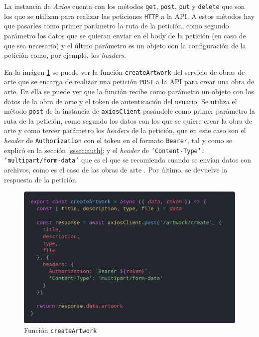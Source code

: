 La instancia de \textit{Axios} \cite{axios} cuenta con los métodos \texttt{get},
\texttt{post}, \texttt{put} y \texttt{delete} que son los que se utilizan para realizar
las peticiones \texttt{HTTP} a la API. A estos métodos hay que pasarles como primer
parámetro la ruta de la petición, como segundo parámetro los datos que se quieran enviar
en el body de la petición (en caso de que sea necesario) y el últmo parámetro es un objeto
con la configuración de la petición como, por ejemplo, los \textit{headers}.

En la imágen \ref{fig:create-artwork-service} se puede ver la función \texttt{createArtwork}
del servicio de obras de arte que se encarga de realizar una petición \texttt{POST} a la API
para crear una obra de arte. En ella se puede ver que la función recibe como parámetro un
objeto con los datos de la obra de arte y el token de autenticación del usuario. Se utiliza
el método \texttt{post} de la instancia de \texttt{axiosClient} pasándole como primer
parámetro la ruta de la petición, como segundo los datos con los que se quiere crear la obra
de arte y como tercer parámetro los \textit{headers} de la petición, que en este caso son
el \textit{header} de \texttt{Authorization} con el token en el formato \texttt{Bearer}, tal
y como se explicó en la sección \ref{sssec:auth}; y el \textit{header} de
\texttt{'Content-Type': 'multipart/form-data'} que es el que se recomienda cuando se envían
datos con archivos, como es el caso de las obras de arte \cite{multipart-form-data}. Por
último, se devuelve la respuesta de la petición.

\begin{figure}[H]
  \centering
  \includegraphics[width=1\textwidth]{img/create-artwork-service}
  \caption{Función \texttt{createArtwork}}
  \label{fig:create-artwork-service}
\end{figure}
